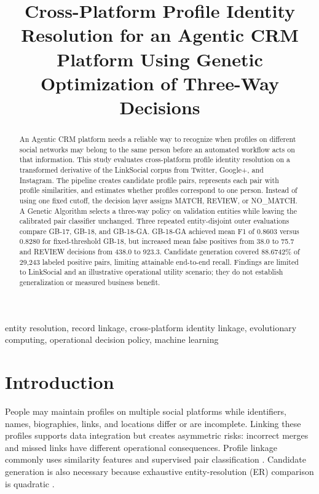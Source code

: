 \documentclass[conference]{IEEEtran}
\begin{document}
\title{Cross-Platform Profile Identity Resolution for an Agentic CRM Platform Using Genetic Optimization of Three-Way Decisions}
\author{}
\maketitle

\begin{abstract}
An Agentic CRM platform needs a reliable way to recognize when profiles on different social networks may belong to the same person before an automated workflow acts on that information. This study evaluates cross-platform profile identity resolution on a transformed derivative of the LinkSocial corpus from Twitter, Google+, and Instagram. The pipeline creates candidate profile pairs, represents each pair with profile similarities, and estimates whether profiles correspond to one person. Instead of using one fixed cutoff, the decision layer assigns MATCH, REVIEW, or NO\_MATCH. A Genetic Algorithm selects a three-way policy on validation entities while leaving the calibrated pair classifier unchanged. Three repeated entity-disjoint outer evaluations compare GB-17, GB-18, and GB-18-GA. %
GB-18-GA achieved mean F1 of 0.8603 versus 0.8280 for fixed-threshold GB-18, but increased mean false positives from 38.0 to 75.7 and REVIEW decisions from 438.0 to 923.3. %
Candidate generation covered 88.6742\% of 29,243 labeled positive pairs, limiting attainable end-to-end recall. Findings are limited to LinkSocial and an illustrative operational utility scenario; they do not establish generalization or measured business benefit.
\end{abstract}

\begin{IEEEkeywords}
entity resolution, record linkage, cross-platform identity linkage, evolutionary computing, operational decision policy, machine learning
\end{IEEEkeywords}

\section{Introduction}
People may maintain profiles on multiple social platforms while identifiers, names, biographies, links, and locations differ or are incomplete. Linking these profiles supports data integration but creates asymmetric risks: incorrect merges and missed links have different operational consequences. Profile linkage commonly uses similarity features and supervised pair classification \cite{sharma2018linksocial,yao2023profile}. Candidate generation is also necessary because exhaustive entity-resolution (ER) comparison is quadratic \cite{papadakis2021blocking,li2020blocking}.
\end{document}
